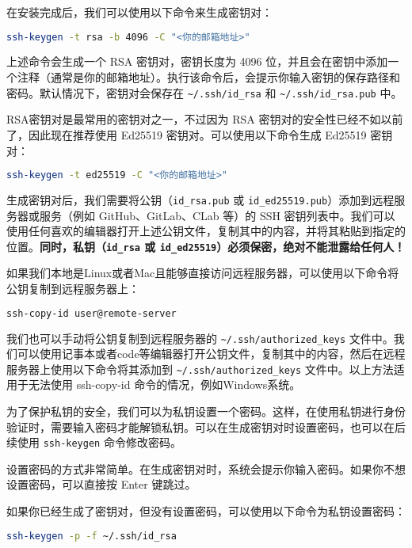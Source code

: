 \documentclass[../main.tex]{subfiles}
\begin{document}
在安装完成后，我们可以使用以下命令来生成密钥对：
\begin{lstlisting}[language=bash]
ssh-keygen -t rsa -b 4096 -C "<你的邮箱地址>"
\end{lstlisting}

上述命令会生成一个 RSA 密钥对，密钥长度为 4096 位，并且会在密钥中添加一个注释（通常是你的邮箱地址）。执行该命令后，会提示你输入密钥的保存路径和密码。默认情况下，密钥对会保存在 \texttt{\textasciitilde/.ssh/id\_rsa} 和 \texttt{\textasciitilde/.ssh/id\_rsa.pub} 中。

RSA密钥对是最常用的密钥对之一，不过因为 RSA 密钥对的安全性已经不如以前了，因此现在推荐使用 Ed25519 密钥对。可以使用以下命令生成 Ed25519 密钥对：
\begin{lstlisting}[language=bash]
ssh-keygen -t ed25519 -C "<你的邮箱地址>"
\end{lstlisting}

生成密钥对后，我们需要将公钥（\texttt{id\_rsa.pub} 或 \texttt{id\_ed25519.pub}）添加到远程服务器或服务（例如 GitHub、GitLab、CLab 等）的 SSH 密钥列表中。我们可以使用任何喜欢的编辑器打开上述公钥文件，复制其中的内容，并将其粘贴到指定的位置。\textbf{\color{red}同时，私钥（\texttt{id\_rsa} 或 \texttt{id\_ed25519}）必须保密，绝对不能泄露给任何人！}

如果我们本地是Linux或者Mac且能够直接访问远程服务器，可以使用以下命令将公钥复制到远程服务器上：
\begin{lstlisting}[language=bash]
ssh-copy-id user@remote-server
\end{lstlisting}

我们也可以手动将公钥复制到远程服务器的 \texttt{\textasciitilde/.ssh/authorized\_keys} 文件中。我们可以使用记事本或者code等编辑器打开公钥文件，复制其中的内容，然后在远程服务器上使用以下命令将其添加到 \texttt{\textasciitilde/.ssh/authorized\_keys} 文件中。以上方法适用于无法使用 ssh-copy-id 命令的情况，例如Windows系统。

为了保护私钥的安全，我们可以为私钥设置一个密码。这样，在使用私钥进行身份验证时，需要输入密码才能解锁私钥。可以在生成密钥对时设置密码，也可以在后续使用 \texttt{ssh-keygen} 命令修改密码。

设置密码的方式非常简单。在生成密钥对时，系统会提示你输入密码。如果你不想设置密码，可以直接按 Enter 键跳过。

如果你已经生成了密钥对，但没有设置密码，可以使用以下命令为私钥设置密码：
\begin{lstlisting}[language=bash]
ssh-keygen -p -f ~/.ssh/id_rsa
\end{lstlisting}
\end{document}
